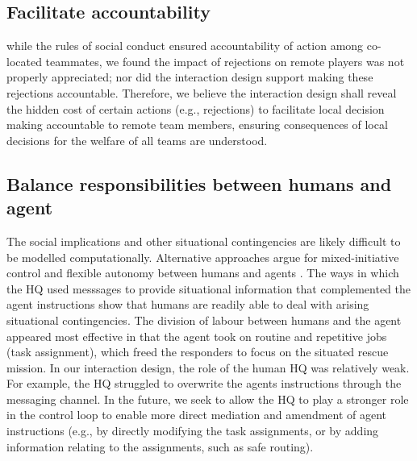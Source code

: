 \subsection{Facilitate accountability}
while the rules of social conduct ensured accountability of action among co-located teammates, we found the impact of rejections on remote players was not properly appreciated; nor did the interaction design support making these rejections accountable. Therefore, we believe the interaction design shall reveal the hidden cost of certain actions (e.g., rejections) to facilitate local decision making accountable to remote team members, ensuring consequences of local decisions for the welfare of all teams are understood. 

\subsection{Balance responsibilities between humans and agent}\label{sec:balanceResponsibility}
 The social implications and other situational contingencies are likely difficult to be modelled computationally. Alternative approaches argue for mixed-initiative  control and flexible autonomy between humans and agents \cite{Bradshaw2011}. The ways in which the HQ used messsages to provide situational information that complemented the agent instructions show that humans are readily able to deal with arising situational contingencies. The division of labour between humans and the agent appeared most effective in that the agent took on routine and repetitive jobs (task assignment), which freed the responders to focus on the situated rescue mission. In our interaction design, the role of the human HQ was relatively weak. For example, the HQ struggled to overwrite the agents instructions through the messaging channel. In the future, we seek to allow the HQ to play a stronger role in the control loop to enable more direct mediation and amendment of agent instructions (e.g., by directly modifying the task assignments, or by adding information relating to the assignments, such as safe routing).
 


